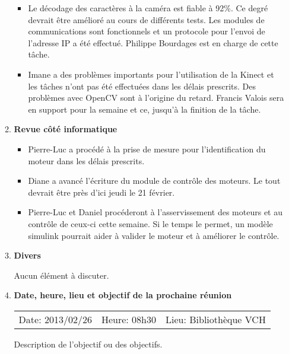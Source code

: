 \documentclass[12pt]{ULojpv}
\begin{document}
\begin{enumerate}
\begin{enumerate}
\begin{itemize}
\item Le décodage des caractères à la caméra est fiable à 92\%. Ce degré devrait être amélioré au cours de différents tests. Les modules de communications sont fonctionnels et un protocole pour l'envoi de l'adresse IP a été effectué. Philippe Bourdages est en charge de cette tâche.

\item Imane a des problèmes importants pour l'utilisation de la Kinect et les tâches n'ont pas été effectuées dans les délais prescrits. Des problèmes avec OpenCV sont à l'origine du retard. Francis Valois sera en support pour la semaine et ce, jusqu'à la finition de la tâche.

\end{itemize}

\item\textbf{Revue côté informatique}

\begin{itemize}
\item Pierre-Luc a procédé à la prise de mesure pour l'identification du moteur dans les délais prescrits.
\item Diane a avancé l'écriture du module de contrôle des moteurs. Le tout devrait être près d'ici jeudi le 21 février.
\item Pierre-Luc et Daniel procéderont à l'asservissement des moteurs et au contrôle de ceux-ci cette semaine. Si le temps le permet, un modèle simulink pourrait aider à valider le moteur et à améliorer le contrôle.
\end{itemize}




\item \textbf{Divers}

Aucun élément à discuter.
\\



\item \textbf{Date, heure, lieu et objectif de la prochaine réunion}

\begin{tabular}{@{}lll}
   Date: 2013/02/26
   & Heure: 08h30
   &  Lieu: Bibliothèque VCH
\end{tabular}
\par
Description de l'objectif ou des objectifs.


\end{enumerate}
\end{enumerate}
\end{document}
